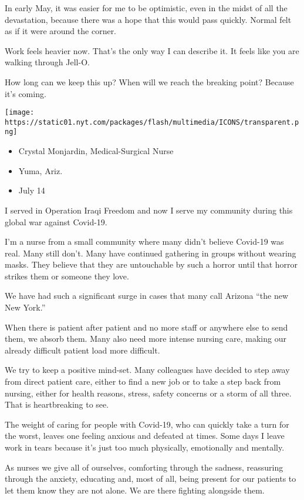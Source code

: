 In early May, it was easier for me to be optimistic, even in the midst
of all the devastation, because there was a hope that this would pass
quickly. Normal felt as if it were around the corner.

Work feels heavier now. That's the only way I can describe it. It feels
like you are walking through Jell-O.

How long can we keep this up? When will we reach the breaking point?
Because it's coming.

\texttt{[image: https://static01.nyt.com/packages/flash/multimedia/ICONS/transparent.png]}

\begin{itemize}
\tightlist
\item
  Crystal Monjardin, Medical-Surgical Nurse
\item
  Yuma, Ariz.
\item
  July 14
\end{itemize}

I served in Operation Iraqi Freedom and now I serve my community during
this global war against Covid-19.

I'm a nurse from a small community where many didn't believe Covid-19
was real. Many still don't. Many have continued gathering in groups
without wearing masks. They believe that they are untouchable by such a
horror until that horror strikes them or someone they love.

We have had such a significant surge in cases that many call Arizona
``the new New York.''

When there is patient after patient and no more staff or anywhere else
to send them, we absorb them. Many also need more intense nursing care,
making our already difficult patient load more difficult.

We try to keep a positive mind-set. Many colleagues have decided to step
away from direct patient care, either to find a new job or to take a
step back from nursing, either for health reasons, stress, safety
concerns or a storm of all three. That is heartbreaking to see.

The weight of caring for people with Covid-19, who can quickly take a
turn for the worst, leaves one feeling anxious and defeated at times.
Some days I leave work in tears because it's just too much physically,
emotionally and mentally.

As nurses we give all of ourselves, comforting through the sadness,
reassuring through the anxiety, educating and, most of all, being
present for our patients to let them know they are not alone. We are
there fighting alongside them.

